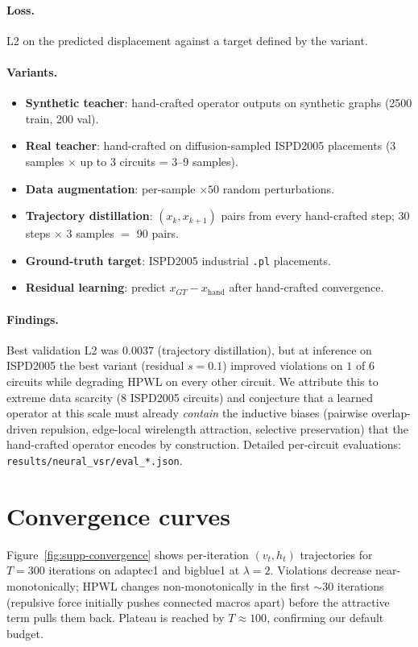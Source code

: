 \documentclass{article}
\begin{document}
\paragraph{Loss.} L2 on the predicted displacement against a target defined
by the variant.

\paragraph{Variants.}
\begin{itemize}
\item \textbf{Synthetic teacher}: hand-crafted operator outputs on synthetic
graphs (2500 train, 200 val).
\item \textbf{Real teacher}: hand-crafted on diffusion-sampled ISPD2005 placements
(3 samples $\times$ up to 3 circuits = 3--9 samples).
\item \textbf{Data augmentation}: per-sample $\times 50$ random perturbations.
\item \textbf{Trajectory distillation}: $(x_k, x_{k+1})$ pairs from every
hand-crafted step; 30 steps $\times$ 3 samples $=$ 90 pairs.
\item \textbf{Ground-truth target}: ISPD2005 industrial \texttt{.pl} placements.
\item \textbf{Residual learning}: predict $x_{GT} - x_{\text{hand}}$ after
hand-crafted convergence.
\end{itemize}

\paragraph{Findings.}  Best validation L2 was $0.0037$ (trajectory
distillation), but at inference on ISPD2005 the best variant (residual
$s{=}0.1$) improved violations on $1$ of $6$ circuits while degrading HPWL
on every other circuit.  We attribute this to extreme data scarcity (8
ISPD2005 circuits) and conjecture that a learned operator at this scale
must already \emph{contain} the inductive biases (pairwise overlap-driven
repulsion, edge-local wirelength attraction, selective preservation) that the
hand-crafted operator encodes by construction.  Detailed per-circuit
evaluations: \texttt{results/neural\_vsr/eval\_*.json}.

\section{Convergence curves}
\label{sec:supp-convergence}

Figure~\ref{fig:supp-convergence} shows per-iteration $(v_t, h_t)$
trajectories for $T=300$ iterations on adaptec1 and bigblue1 at
$\lambda=2$.  Violations decrease near-monotonically; HPWL changes
non-monotonically in the first $\sim 30$ iterations (repulsive force
initially pushes connected macros apart) before the attractive term
pulls them back.  Plateau is reached by $T \approx 100$, confirming our
default budget.
\end{document}

